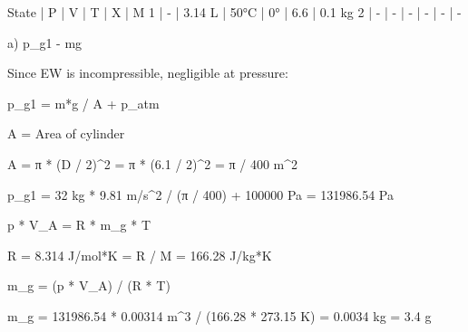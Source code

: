 State | P | V | T | X | M  
1 | - | 3.14 L | 50°C | 0° | 6.6 | 0.1 kg  
2 | - | - | - | - | - | -  

a) p_g1 - mg

Since EW is incompressible, negligible at pressure:

p_g1 = m*g / A + p_atm

A = Area of cylinder

A = π * (D / 2)^2 = π * (6.1 / 2)^2 = π / 400 m^2

p_g1 = 32 kg * 9.81 m/s^2 / (π / 400) + 100000 Pa = 131986.54 Pa

p * V_A = R * m_g * T

R = 8.314 J/mol*K = R / M = 166.28 J/kg*K

m_g = (p * V_A) / (R * T)

m_g = 131986.54 * 0.00314 m^3 / (166.28 * 273.15 K) = 0.0034 kg = 3.4 g